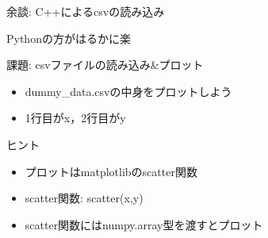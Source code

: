 \documentclass[12pt, dvipdfmx]{beamer}
\begin{document}
\begin{frame}{余談: C++によるcsvの読み込み}
    \loadcsvcpp

    \pause
    \alert{Pythonの方がはるかに楽}
\end{frame}
\begin{frame}{課題: csvファイルの読み込み\&プロット}
    \begin{itemize}
        \item dummy\_data.csvの中身をプロットしよう
        \item 1行目がx，2行目がy
    \end{itemize}
    \begin{exampleblock}{ヒント}
        \begin{itemize}
            \item プロットはmatplotlibのscatter関数
            \item scatter関数: scatter(x,y)
            \item scatter関数にはnumpy.array型を渡すとプロット
        \end{itemize}    
    \end{exampleblock}
\end{frame}
\end{document}
